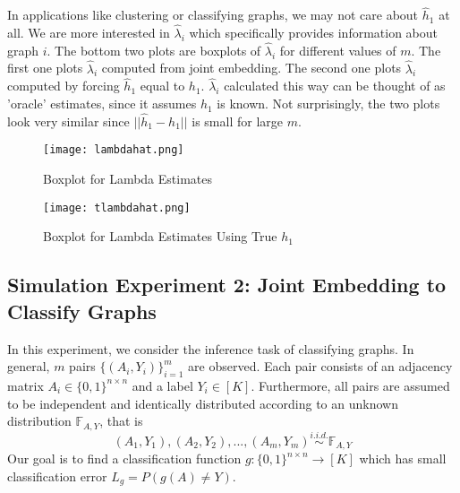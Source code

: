 \documentclass[10pt,journal,compsoc]{IEEEtran}
\begin{document}
\noindent In applications like clustering or classifying graphs, we may not care about $\hat{h}_1$ at all. We are more interested in $\hat{\lambda}_i$ which specifically provides information about graph $i$. The bottom two plots are boxplots of $\hat{\lambda}_i$ for different values of $m$. The first one plots $\hat{\lambda}_i$ computed from joint embedding. The second one plots $\hat{\lambda}_i$ computed by forcing $\hat{h}_1$ equal to $h_1$. $\hat{\lambda}_i$ calculated this way can be thought of as 'oracle' estimates, since it assumes $h_1$ is known. Not surprisingly, the two plots look very similar since $||\hat{h}_1-h_1||$ is small for large $m$.
\begin{figure}[!htbp]
	\centering
	\texttt{[image: lambdahat.png]}
	\caption{Boxplot for Lambda Estimates}
\end{figure}
\begin{figure}[!htbp]
	\centering
	\texttt{[image: tlambdahat.png]}
	\caption{Boxplot for Lambda Estimates Using True $h_1$}
\end{figure}

\subsection{Simulation Experiment 2: Joint Embedding to Classify Graphs}
In this experiment, we consider the inference task of classifying graphs.  In general, $m$ pairs $\{(A_i,Y_i)\}_{i=1}^{m}$ are observed. Each pair consists of an adjacency matrix $A_i \in \{0,1\}^{n \times n}$ and a label $Y_i \in [K]$. Furthermore, all pairs are assumed to be independent and identically distributed according to an unknown distribution $\mathbb{F}_{A,Y}$, that is
\[(A_1,Y_1),(A_2,Y_2),...,(A_m,Y_m) \overset{i.i.d.}{\sim} \mathbb{F}_{A,Y} \] 
Our goal is to find a classification function $g:\{0,1\}^{n \times n} \rightarrow [K]$ which has small classification error $L_g=P(g(A)\neq Y)$. \\ 
\end{document}
